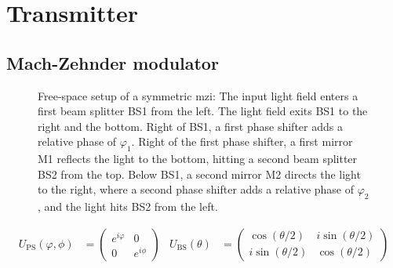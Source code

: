 \section{Transmitter}

\subsection{Mach-Zehnder modulator}

\begin{figure}[htb]
	\centering
	
	\caption{Free-space setup of a symmetric \gls{mzi}: The input light field enters a first beam splitter BS1 from the left. The light field exits BS1 to the right and the bottom. Right of BS1, a first phase shifter adds a relative phase of $\varphi_1$. Right of the first phase shifter, a first mirror M1 reflects the light to the bottom, hitting a second beam splitter BS2 from the top. Below BS1, a second mirror M2 directs the light to the right, where a second phase shifter adds a relative phase of $\varphi_2$, and the light hits BS2 from the left.}
\end{figure}

\begin{align}
	U_\text{PS}(\varphi,\phi)
	&=
	\begin{pmatrix}
		e^{i\varphi} & 0 \\
		0 & e^{i\phi}
	\end{pmatrix}
	&
	U_\text{BS}(\theta)
	&=
	\begin{pmatrix}
		\cos(\theta/2) & i\sin(\theta/2) \\
		i\sin(\theta/2) & \cos(\theta/2)
	\end{pmatrix}
\end{align}

